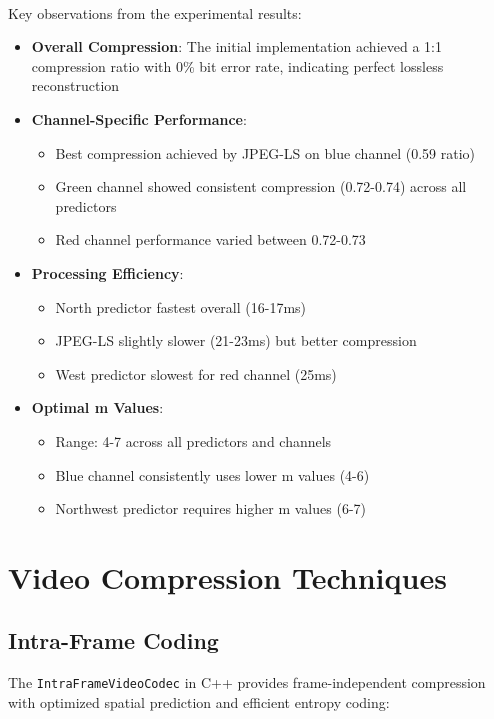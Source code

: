 \documentclass[a4paper,14pt]{article}
\begin{document}
\paragraph{}
Key observations from the experimental results:
\begin{itemize}
    \item \textbf{Overall Compression}: The initial implementation achieved a 1:1 compression ratio with 0\% bit error rate, indicating perfect lossless reconstruction
    
    \item \textbf{Channel-Specific Performance}:
    \begin{itemize}
        \item Best compression achieved by JPEG-LS on blue channel (0.59 ratio)
        \item Green channel showed consistent compression (0.72-0.74) across all predictors
        \item Red channel performance varied between 0.72-0.73
    \end{itemize}
    
    \item \textbf{Processing Efficiency}:
    \begin{itemize}
        \item North predictor fastest overall (16-17ms)
        \item JPEG-LS slightly slower (21-23ms) but better compression
        \item West predictor slowest for red channel (25ms)
    \end{itemize}
    
    \item \textbf{Optimal m Values}:
    \begin{itemize}
        \item Range: 4-7 across all predictors and channels
        \item Blue channel consistently uses lower m values (4-6)
        \item Northwest predictor requires higher m values (6-7)
    \end{itemize}
\end{itemize}

\section{Video Compression Techniques}

\subsection{Intra-Frame Coding}
The \texttt{IntraFrameVideoCodec} in C++ provides frame-independent compression with optimized spatial prediction and efficient entropy coding:
\end{document}
